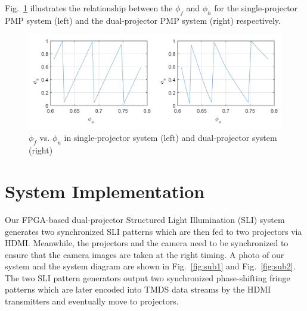 \documentclass[]{spie}  %
\begin{document}
Fig.~\ref{Fig:3} illustrates the relationship between the $\phi_f$ and $\phi_h$ for the single-projector PMP system (left) and the dual-projector PMP system (right) respectively.
\begin{figure}[!t]
  \includegraphics[width=\linewidth]{phase.png}
  \caption{$\phi_f$ vs. $\phi_u$ in single-projector system (left) and dual-projector system (right)}
  \label{Fig:3}
\end{figure}




















\section{System Implementation}
Our FPGA-based dual-projector Structured Light Illumination (SLI) system generates two synchronized SLI patterns which are then fed to two projectors via HDMI. Meanwhile, the projectors and the camera need to be synchronized to ensure that the camera images are taken at the right timing. A photo of our system and the system diagram are shown in Fig.~\ref{fig:sub1} and Fig.~\ref{fig:sub2}. The two SLI pattern generators output two synchronized phase-shifting fringe patterns which are later encoded into TMDS data streams by the HDMI transmitters and eventually move to projectors. 

\end{document}
